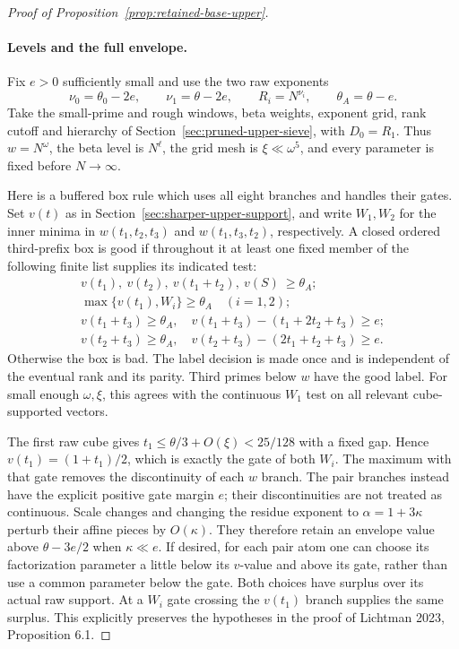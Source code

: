 \begin{proof}[Proof of Proposition~\ref{prop:retained-base-upper}]
\paragraph{Levels and the full envelope.}
Fix $e>0$ sufficiently small and use the two raw exponents
\[
 \nu_0=\theta_0-2e,\qquad \nu_1=\theta-2e,
 \qquad R_i=N^{\nu_i},\qquad \theta_A=\theta-e.
\]
Take the small-prime and rough windows, beta weights, exponent grid,
rank cutoff and hierarchy of Section~\ref{sec:pruned-upper-sieve},
with $D_0=R_1$. Thus $w=N^\omega$, the beta level is $N^\ell$,
the grid mesh is $\xi\ll\omega^5$, and every parameter is fixed
before $N\to\infty$.

Here is a buffered box rule which uses all eight branches and handles
their gates. Set $v(t)$ as in Section~\ref{sec:sharper-upper-support},
and write $W_1,W_2$ for the inner minima in
$w(t_1,t_2,t_3)$ and $w(t_1,t_3,t_2)$, respectively.
A closed ordered third-prefix box is good if throughout it at least
one fixed member of the following finite list supplies its indicated
test:
\[
 \begin{gathered}
 v(t_1),\ v(t_2),\ v(t_1+t_2),\ v(S)\ \ge\theta_A;\\
 \max\{v(t_1),W_i\}\ge\theta_A\quad(i=1,2);\\
 v(t_1+t_3)\ge\theta_A,\quad
 v(t_1+t_3)-(t_1+2t_2+t_3)\ge e;\\
 v(t_2+t_3)\ge\theta_A,\quad
 v(t_2+t_3)-(2t_1+t_2+t_3)\ge e.
 \end{gathered}
\]
Otherwise the box is bad. The label decision is made once and is
independent of the eventual rank and its parity. Third primes below
$w$ have the good label. For small enough $\omega,\xi$, this agrees
with the continuous $W_1$ test on all relevant cube-supported vectors.

The first raw cube gives $t_1\le\theta/3+O(\xi)<25/128$ with a
fixed gap. Hence $v(t_1)=(1+t_1)/2$, which is exactly the gate of
both $W_i$. The maximum with that gate removes the discontinuity
of each $w$ branch. The pair branches instead have the explicit
positive gate margin $e$; their discontinuities are not treated as
continuous. Scale changes and changing the residue exponent to
$\alpha=1+3\kappa$ perturb their affine pieces by $O(\kappa)$.
They therefore retain an envelope value above
$\theta-3e/2$ when $\kappa\ll e$. If desired, for each pair atom
one can choose its factorization parameter a little below its
$v$-value and above its gate, rather than use a common parameter
below the gate. Both choices have surplus over its actual raw
support. At a $W_i$ gate crossing the $v(t_1)$ branch supplies the
same surplus. This explicitly preserves the hypotheses in the proof
of Lichtman 2023, Proposition 6.1.


\end{proof}
